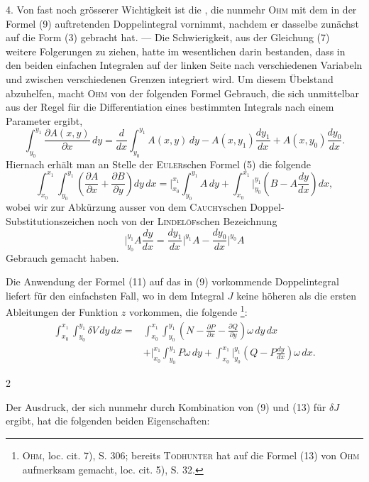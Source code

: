 4. Von fast noch grösserer Wichtigkeit ist die , die nunmehr
\textsc{Ohm} mit dem in der Formel (9) auftretenden Doppelintegral vornimmt,
nachdem er dasselbe zunächst auf die Form (3) gebracht hat. — Die Schwierigkeit,
aus der Gleichung (7) weitere Folgerungen zu ziehen, hatte im wesentlichen
darin bestanden, dass in den beiden einfachen Integralen auf der linken
Seite nach verschiedenen Variabeln und zwischen verschiedenen Grenzen integriert
wird. Um diesem Übelstand abzuhelfen, macht \textsc{Ohm} von der folgenden
Formel Gebrauch, die sich unmittelbar aus der Regel für die Differentiation
eines bestimmten Integrals nach einem Parameter ergibt,
\begin{equation*}
\int_{y_0}^{y_1}\frac{\partial A(x,y)}{\partial x}\,dy
=\frac{d}{dx}\int_{y_0}^{y_1}A(x,y)\,dy-A(x,y_1)\frac{dy_1}{dx}+A(x,y_0)\frac{dy_0}{dx}.\tag{10}
\end{equation*}
Hiernach erhält man an Stelle der \textsc{Euler}schen Formel (5) die folgende
\begin{equation*}
\int_{x_0}^{x_1}\int_{y_0}^{y_1}\left(\frac{\partial A}{\partial x}+\frac{\partial B}{\partial y}\right)dy\,dx
=\Big|_{x_0}^{x_1}\int_{y_0}^{y_1}A\,dy+\int_{x_0}^{x_1}\Big|_{y_0}^{y_1}\left(B-A\frac{dy}{dx}\right)dx,\tag{11}
\end{equation*}
wobei wir zur Abkürzung ausser von dem \textsc{Cauchy}schen Doppel-Substitutionszeichen
noch von der \textsc{Lindelöf}schen Bezeichnung
\begin{equation*}
\Big|_{y_0}^{y_1}A\frac{dy}{dx}=\frac{dy_1}{dx}\Big|^{y_1}A-\frac{dy_0}{dx}\Big|^{y_0}A\tag{12}
\end{equation*}
Gebrauch gemacht haben.

Die Anwendung der Formel (11) auf das in (9) vorkommende Doppelintegral
liefert für den einfachsten Fall, wo in dem Integral $J$ keine höheren
als die ersten Ableitungen der Funktion $z$ vorkommen, die folgende \footnote{\textsc{Ohm}, loc. cit. 7), S. 306; bereits \textsc{Todhunter} hat auf die Formel (13) von \textsc{Ohm} aufmerksam gemacht, loc. cit. 5), S. 32.}:
\begin{equation*}
\begin{aligned}
\int_{x_0}^{x_1}\int_{y_0}^{y_1}\delta V\,dy\,dx
={}&\int_{x_0}^{x_1}\int_{y_0}^{y_1}\left(N-\frac{\partial P}{\partial x}-\frac{\partial Q}{\partial y}\right)\omega\,dy\,dx\\
&+\Big|_{x_0}^{x_1}\int_{y_0}^{y_1}P\omega\,dy+\int_{x_0}^{x_1}\Big|_{y_0}^{y_1}\left(Q-P\frac{dy}{dx}\right)\omega\,dx.
\end{aligned}\tag{13}
\end{equation*}
\par\smallskip{}\hfill{\small 2}\par
\clearpage{}
\noindent\hspace*{\parindent}Der Ausdruck, der sich nunmehr durch Kombination von (9) und (13)
für $\delta J$ ergibt, hat die folgenden beiden Eigenschaften:

